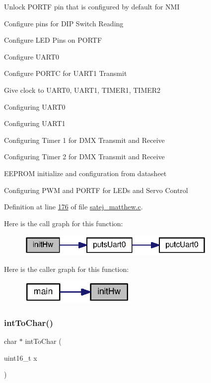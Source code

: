 Unlock P\+O\+R\+TF pin that is configured by default for N\+MI

Configure pins for D\+IP Switch Reading

Configure L\+ED Pins on P\+O\+R\+TF

Configure U\+A\+R\+T0

Configure P\+O\+R\+TC for U\+A\+R\+T1 Transmit

Give clock to U\+A\+R\+T0, U\+A\+R\+T1, T\+I\+M\+E\+R1, T\+I\+M\+E\+R2

Configuring U\+A\+R\+T0

Configuring U\+A\+R\+T1

Configuring Timer 1 for D\+MX Transmit and Receive

Configuring Timer 2 for D\+MX Transmit and Receive

E\+E\+P\+R\+OM initialize and configuration from datasheet

Configuring P\+WM and P\+O\+R\+TF for L\+E\+Ds and Servo Control

Definition at line \mbox{\hyperlink{satej__matthew_8c_source_l00176}{176}} of file \mbox{\hyperlink{satej__matthew_8c_source}{satej\+\_\+matthew.\+c}}.

Here is the call graph for this function\+:
\nopagebreak
\begin{figure}[H]
\begin{center}
\leavevmode
\includegraphics[width=277pt]{satej__matthew_8c_ae5e20c90f0611c1fd09fad99cc3a30a6_cgraph}
\end{center}
\end{figure}
Here is the caller graph for this function\+:
\nopagebreak
\begin{figure}[H]
\begin{center}
\leavevmode
\includegraphics[width=161pt]{satej__matthew_8c_ae5e20c90f0611c1fd09fad99cc3a30a6_icgraph}
\end{center}
\end{figure}
\mbox{\label{satej__matthew_8c_a48ff33038777eac27bf41ff14b9368bf}} 
\subsubsection{\texorpdfstring{intToChar()}{intToChar()}}
{\footnotesize\ttfamily char $\ast$ int\+To\+Char (\begin{DoxyParamCaption}\item[{uint16\+\_\+t}]{x }\end{DoxyParamCaption})}



